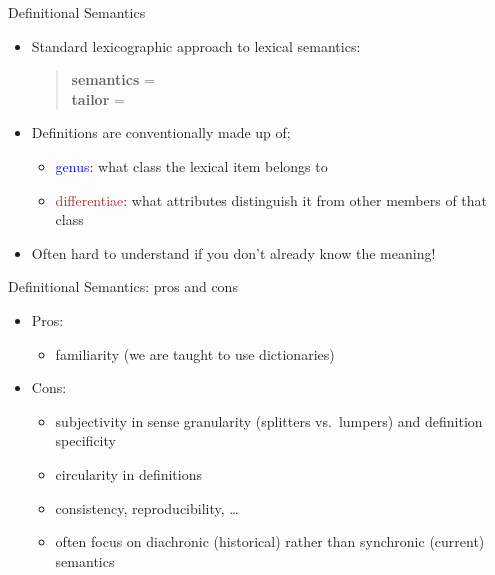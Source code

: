 \begin{frame}{Definitional Semantics}


  \begin{itemize}
  \item Standard lexicographic approach to lexical semantics:
    \begin{quote}
      \textbf{semantics} = \\
      \textbf{tailor} = 
    \end{quote}
  \item Definitions are conventionally made up of;
    \begin{itemize}
    \item \textcolor{blue}{genus}: what class the lexical item belongs to
    \item \textcolor{brown}{differentiae}: what attributes distinguish it from
      other members of that class
    \end{itemize}
  \item Often hard  to understand if you don't already know the meaning!
  \end{itemize}
\end{frame}

\begin{frame}{Definitional Semantics: pros and cons}
  \begin{itemize}
  \item Pros:
  \begin{itemize}
  \item familiarity (we are taught to use dictionaries)
  \end{itemize}
\item Cons:
  \begin{itemize}
  \item subjectivity in sense granularity (splitters vs.\ lumpers) and
    definition specificity
  \item circularity in definitions
  \item consistency, reproducibility, \ldots
  \item often focus on diachronic (historical) rather than synchronic (current) semantics 
  \end{itemize}
\end{itemize}
\end{frame}

